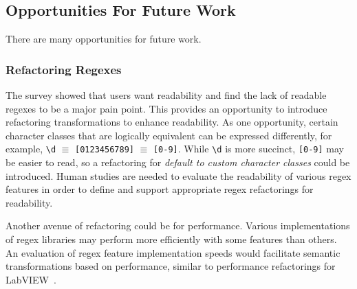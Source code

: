 \subsection{Opportunities For Future Work}

There are many opportunities for future work. 




\subsubsection{Refactoring Regexes}
The survey showed that users want readability and find the lack of readable regexes to be a major pain point.
This provides an opportunity to introduce refactoring transformations to enhance readability.
As one opportunity, certain character classes that are logically equivalent can be expressed differently, for example, \verb!\d! $\equiv$ \verb![0123456789]! $\equiv$ \verb![0-9]!. While \verb!\d! is more succinct, \verb![0-9]! may be easier to read, so a refactoring for \emph{default to custom character classes} could be introduced.
Human studies are needed to evaluate the readability of various regex features in order to define and support appropriate regex refactorings for readability.

Another avenue of refactoring could be for performance. Various implementations of regex libraries may perform more efficiently with some features than others. An evaluation of regex feature implementation speeds would facilitate semantic transformations based on performance, similar to performance refactorings for LabVIEW~\cite{chambers2013smell, chambers2015impact}.



